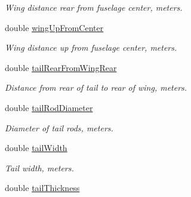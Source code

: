 \begin{DoxyCompactItemize}
\begin{DoxyCompactList}\small\item\em Wing distance rear from fuselage center, meters. \end{DoxyCompactList}\item 
\hypertarget{class_shadow_uav_display_ab12e388e9a8f019e80afe151ac810409}{
double \hyperlink{class_shadow_uav_display_ab12e388e9a8f019e80afe151ac810409}{wingUpFromCenter}}
\label{class_shadow_uav_display_ab12e388e9a8f019e80afe151ac810409}

\begin{DoxyCompactList}\small\item\em Wing distance up from fuselage center, meters. \end{DoxyCompactList}\item 
\hypertarget{class_shadow_uav_display_a91c05e52fcc763c1e097910a24683098}{
double \hyperlink{class_shadow_uav_display_a91c05e52fcc763c1e097910a24683098}{tailRearFromWingRear}}
\label{class_shadow_uav_display_a91c05e52fcc763c1e097910a24683098}

\begin{DoxyCompactList}\small\item\em Distance from rear of tail to rear of wing, meters. \end{DoxyCompactList}\item 
\hypertarget{class_shadow_uav_display_a1631e5f60e37892b967e29a2693ff12f}{
double \hyperlink{class_shadow_uav_display_a1631e5f60e37892b967e29a2693ff12f}{tailRodDiameter}}
\label{class_shadow_uav_display_a1631e5f60e37892b967e29a2693ff12f}

\begin{DoxyCompactList}\small\item\em Diameter of tail rods, meters. \end{DoxyCompactList}\item 
\hypertarget{class_shadow_uav_display_a8ca62e1989b18a149e7ecadaa8807e84}{
double \hyperlink{class_shadow_uav_display_a8ca62e1989b18a149e7ecadaa8807e84}{tailWidth}}
\label{class_shadow_uav_display_a8ca62e1989b18a149e7ecadaa8807e84}

\begin{DoxyCompactList}\small\item\em Tail width, meters. \end{DoxyCompactList}\item 
\hypertarget{class_shadow_uav_display_abee96a8f8496690688aeffde71206f1b}{
double \hyperlink{class_shadow_uav_display_abee96a8f8496690688aeffde71206f1b}{tailThickness}}
\label{class_shadow_uav_display_abee96a8f8496690688aeffde71206f1b}


\end{DoxyCompactItemize}
